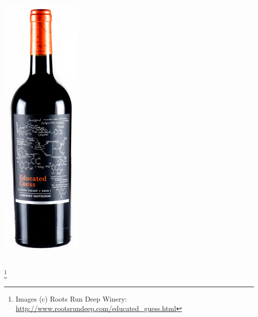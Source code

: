 \documentclass[t]{beamer}
\begin{document}
\begin{ftst}
\begin{columns}[T]
	\centering\includegraphics[width=.9\textwidth]{../figs/edguess2.jpg}
\end{columns}
\let\thefootnote\relax\footnote{\tiny Images (c) Roots Run Deep Winery: \url{http://www.rootsrundeep.com/educated_guess.html}}
\end{ftst}
\end{document}
